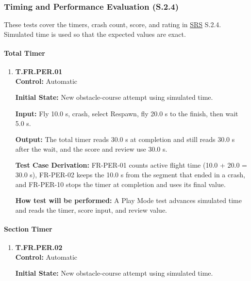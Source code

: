\documentclass[12pt, titlepage]{article}
\begin{document}
\subsubsection{Timing and Performance Evaluation (S.2.4)}

These tests cover the timers, crash count, score, and rating in \hyperlink{abbr:SRS}{SRS} S.2.4. Simulated
time is used so that the expected values are exact.

{\sloppy
\paragraph{Total Timer}

\begin{enumerate}

\item{\hypertarget{test-fr-per-01}{}\textbf{T.FR.PER.01}\\}
\textbf{Control:} Automatic

\textbf{Initial State:} New obstacle-course attempt using simulated time.

\textbf{Input:} Fly 10.0 s, crash, select Respawn, fly 20.0 s to the finish, then wait
5.0 s.

\textbf{Output:} The total timer reads 30.0 s at completion and still reads 30.0 s after
the wait, and the score and review use 30.0 s.

\textbf{Test Case Derivation:} \mbox{FR-PER-01} counts active flight time (10.0 + 20.0 =
30.0 s), \mbox{FR-PER-02} keeps the 10.0 s from the segment that ended in a crash, and
\mbox{FR-PER-10} stops the timer at completion and uses its final value.

\textbf{How test will be performed:} A Play Mode test advances simulated time and reads
the timer, score input, and review value.

\end{enumerate}

\paragraph{Section Timer}

\begin{enumerate}

\item{\hypertarget{test-fr-per-02}{}\textbf{T.FR.PER.02}\\}
\textbf{Control:} Automatic

\textbf{Initial State:} New obstacle-course attempt using simulated time.


\end{enumerate}}
\end{document}
